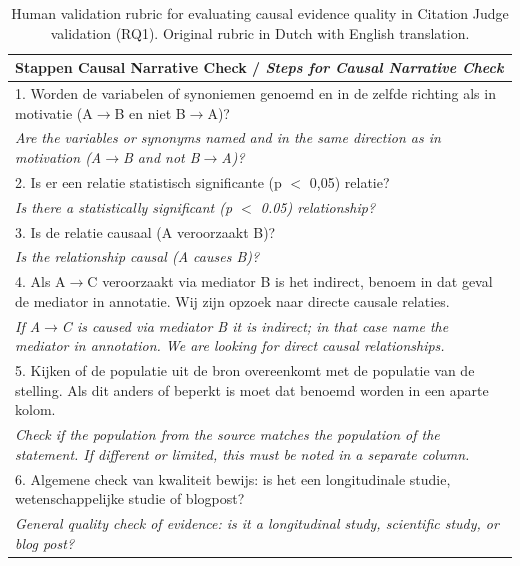 \begin{table}[H]
\centering
\caption[Human validation rubric for RQ1]{Human validation rubric for evaluating causal evidence quality in Citation Judge validation (RQ1). Original rubric in Dutch with English translation.}
\label{tab:human-validation-rubric-rq1}
\small

\begin{tabular}{p{}}
\toprule
\textbf{Stappen Causal Narrative Check} / \textit{Steps for Causal Narrative Check} \\
\midrule
1. Worden de variabelen of synoniemen genoemd en in de zelfde richting als in motivatie (A$\to$B en niet B$\to$A)? \\
\textit{Are the variables or synonyms named and in the same direction as in motivation (A$\to$B and not B$\to$A)?} \\[0.5em]

2. Is er een relatie statistisch significante (p $<$ 0,05) relatie? \\
\textit{Is there a statistically significant (p $<$ 0.05) relationship?} \\[0.5em]

3. Is de relatie causaal (A veroorzaakt B)? \\
\textit{Is the relationship causal (A causes B)?} \\[0.5em]

4. Als A$\to$C veroorzaakt via mediator B is het indirect, benoem in dat geval de mediator in annotatie. Wij zijn opzoek naar directe causale relaties. \\
\textit{If A$\to$C is caused via mediator B it is indirect; in that case name the mediator in annotation. We are looking for direct causal relationships.} \\[0.5em]

5. Kijken of de populatie uit de bron overeenkomt met de populatie van de stelling. Als dit anders of beperkt is moet dat benoemd worden in een aparte kolom. \\
\textit{Check if the population from the source matches the population of the statement. If different or limited, this must be noted in a separate column.} \\[0.5em]

6. Algemene check van kwaliteit bewijs: is het een longitudinale studie, wetenschappelijke studie of blogpost? \\
\textit{General quality check of evidence: is it a longitudinal study, scientific study, or blog post?} \\
\bottomrule
\end{tabular}


\end{table}
